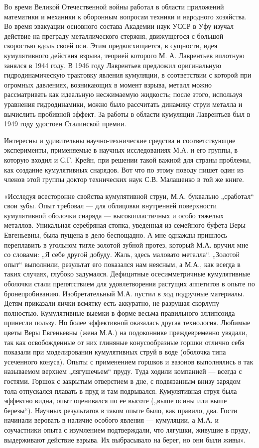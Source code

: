 Во время Великой Отечественной войны  работал в области приложений математики и механики к оборонным вопросам техники и народного хозяйства. Во время эвакуации основного состава Академии наук УССР в Уфу изучал действие на преграду металлического стержня, движущегося с большой скоростью вдоль своей оси. Этим предвосхищается, в сущности, идея кумулятивного действия взрыва, теорией которого М. А. Лаврентьев вплотную занялся в 1944 году. В 1946 году Лаврентьев предложил оригинальную гидродинамическую трактовку явления кумуляции, в соответствии с которой при огромных давлениях, возникающих в момент взрыва, металл можно рассматривать как идеальную несжимаемую жидкость; после этого, используя уравнения гидродинамики, можно было рассчитать динамику струи металла и вычислить пробивной эффект. За работы в области кумуляции Лаврентьев был в 1949 году удостоен Сталинской премии.

Интересны и удивительны научно-технические средства и соответствующие эксперименты, применяемые в научных исследованиях М.А. и его группы, в которую входил и С.Г.  Крейн, при решении такой важной для страны проблемы, как создание кумулятивных снарядов.  Вот что по этому поводу пишет один из членов этой группы доктор технических наук С.В. Малашенко в той же книге.

«Исследуя всесторонне свойства кумулятивной струи, М.А. буквально „сработал“ свои зубы. Опыт требовал — для облицовки внутренней поверхности кумулятивной оболочки снаряда — высокопластичных и особо тяжелых металлов. Уникальная серебряная стопка, уведенная из семейного буфета Веры Евгеньевны, была пущена в дело беспощадно. А мне однажды пришлось переплавить в угольном тигле золотой зубной протез, который М.А. вручил мне со словами: „Я себе другой добуду. Жаль, здесь маловато металла“. „Золотой опыт“ выполнили, результат его показался нам неясным, а М.А., как всегда в таких случаях, глубоко задумался. Дефицитные осесимметричные кумулятивные оболочки стали препятствием для удовлетворения растущих аппетитов в опыте по бронепробиванию. Изобретательный М.А. пустил в ход подручные материалы. Детям приказали яички всмятку есть аккуратно, не разрушая скорлупу полностью. Кумулятивные выемки в форме весьма правильного эллипсоида принесли пользу. Но более эффективной оказалась другая технология. Любимые цветы Веры Евгеньевны (жена М.А.) на подоконнике преждевременно увядали, так как освобожденные от них глиняные конусообразные горшки отлично себя показали при моделировании кумулятивных струй в воде (оболочка типа усеченного конуса). Опыты с применением горшков и вазонов выполнялись в так называемом верхнем „лягушечьем“ пруду. Туда ходили компанией — всегда с гостями. Горшок с закрытым отверстием в дне, с подвязанным внизу зарядом тола отпускался плавать в пруд и там подрывался. Кумулятивная струя была эффектно видна, опыт оценивался по ее высоте („выше осины или выше березы“). Научных результатов в таком опыте было, как правило, два. Гости начинали веровать в наличие особого явления — кумуляции, а М.А. и соучастники опыта с изумлением подтверждали, что лягушки, живущие в пруду, выдерживают действие взрыва. Их выбрасывало на берег, но они были живы».


